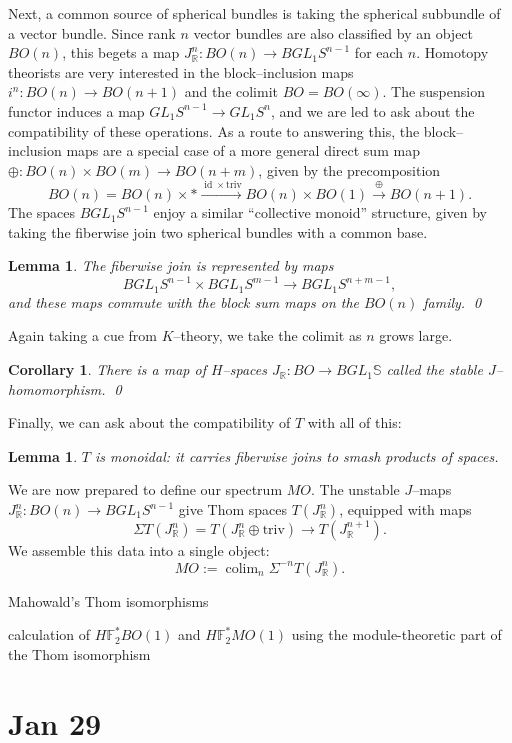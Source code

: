 \documentclass{amsart}
\renewcommand{\S}{\mathbb S}
\newcommand{\F}{\mathbb F}
\newcommand{\R}{\mathbb R}
\newcommand{\<}{\langle}
\renewcommand{\>}{\rangle}
\newcommand{\Susp}{\Sigma}
\newcommand{\GL}{\mathit{GL}}
\DeclareMathOperator{\colim}{colim}
\numberwithin{equation}{section}
\theoremstyle{plain}
\newtheorem{lemma}[equation]{Lemma}
\newtheorem{corollary}[equation]{Corollary}
\theoremstyle{definition}
\theoremstyle{remark}
\begin{document}
Next, a common source of spherical bundles is taking the spherical subbundle of a vector bundle.  Since rank $n$ vector bundles are also classified by an object $BO(n)$, this begets a map $J_{\R}^n: BO(n) \to B \GL_1 S^{n-1}$ for each $n$.  Homotopy theorists are very interested in the block--inclusion maps $i^n: BO(n) \to BO(n+1)$ and the colimit $BO = BO(\infty)$.  The suspension functor induces a map $\GL_1 S^{n-1} \to \GL_1 S^n$, and we are led to ask about the compatibility of these operations.  As a route to answering this, the block--inclusion maps are a special case of a more general direct sum map $\oplus: BO(n) \times BO(m) \to BO(n+m)$, given by the precomposition \[BO(n) = BO(n) \times * \xrightarrow{\operatorname{id} \times \text{triv}} BO(n) \times BO(1) \xrightarrow\oplus BO(n+1).\] The spaces $B \GL_1 S^{n-1}$ enjoy a similar ``collective monoid'' structure, given by taking the fiberwise join two spherical bundles with a common base.
\begin{lemma}
The fiberwise join is represented by maps \[B\GL_1 S^{n-1} \times B\GL_1 S^{m-1} \to B\GL_1 S^{n+m-1},\] and these maps commute with the block sum maps on the $BO(n)$ family. \qed
\end{lemma}
\noindent Again taking a cue from $K$--theory, we take the colimit as $n$ grows large.
\begin{corollary}
There is a map of $H$--spaces $J_{\R}: BO \to B\GL_1 \S$ called the \textit{stable $J$--homomorphism}. \qed
\end{corollary}
\noindent Finally, we can ask about the compatibility of $T$ with all of this:
\begin{lemma}
$T$ is monoidal: it carries fiberwise joins to smash products of spaces.
\end{lemma}

We are now prepared to define our spectrum $MO$.  The unstable $J$--maps $J_{\R}^n: BO(n) \to B\GL_1 S^{n-1}$ give Thom spaces $T(J_{\R}^n)$, equipped with maps \[\Susp T(J_{\R}^n) = T(J_{\R}^n \oplus \text{triv}) \to T(J_{\R}^{n+1}).\] We assemble this data into a single object: \[MO := \colim_n \Susp^{-n} T(J_{\R}^n).\]




Mahowald's Thom isomorphisms

calculation of $H\F_2^* BO(1)$ and $H\F_2^* MO(1)$ using the module-theoretic part of the Thom isomorphism





\section{Jan 29}
\end{document}
